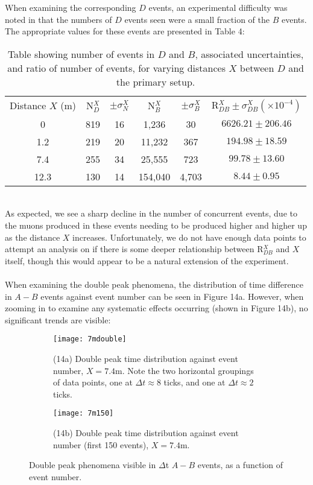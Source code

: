\documentclass[a4paper]{article}
\begin{document}
\newpage \noindent
When examining the corresponding $D$ events, an experimental difficulty was noted in that the numbers of $D$ events seen were a small fraction of the $B$ events. The appropriate values for these events are presented in Table 4:
\begin{table}[h!]
\centering
\begin{tabular}{c|c|c|c|c|c}
	Distance $X$ (m) & N$_D^X$ & $\pm \sigma_N^X$ & N$_B^X$ & $\pm \sigma_B^X$ & R$^{X}_{DB} \pm \sigma^{X}_{DB} (\times 10^{-4}) $      \\ \cline{1-6}
	0 & 819&   16&1,236& 30 & $6626.21 \pm 206.46$\\
	1.2 & 219& 20& 11,232 &367 &$194.98 \pm 18.59$\\
	7.4 & 255 & 34 &25,555& 723 &$99.78 \pm 13.60$\\
	12.3 & 130 & 14& 154,040&4,703 &$8.44 \pm 0.95$
\end{tabular}
\caption{Table showing number of events in $D$ and $B$, associated uncertainties, and ratio of number of events, for varying distances $X$ between $D$ and the primary setup.}
\end{table}
\\
As expected, we see a sharp decline in the number of concurrent events, due to the muons produced in these events needing to be produced higher and higher up as the distance $X$ increases.
Unfortunately, we do not have enough data points to attempt an analysis on if there is some deeper relationship between R$^{X}_{DB}$ and $X$ itself, though this would appear to be a natural extension of the experiment.
\\\\
When examining the double peak phenomena, the distribution of time difference in $A-B$ events against event number can be seen in Figure 14a. However, when zooming in to examine any systematic effects occurring (shown in Figure 14b), no significant trends are visible:
\begin{figure}[h!]
\centering
	 \begin{subfigure}[t!]{0.4\textwidth}
		 \centering
		 \texttt{[image: 7mdouble]}
		 \caption*{(14a) Double peak time distribution against event number, $X=7.4$m. Note the two horizontal groupings of data points, one at $\Delta t \approx 8$ ticks, and one at $\Delta t \approx 2$ ticks.}
	 \end{subfigure}
	 \hfill
	 \begin{subfigure}[t!]{0.4\textwidth}
		 \centering
		\texttt{[image: 7m150]}
		\caption*{(14b) Double peak time distribution against event number (first 150 events), $X=7.4$m.}
	 \end{subfigure}
	 \caption{Double peak phenomena visible in $\Delta$t $A-B$ events, as a function of event number.}
\end{figure}\\
\end{document}
